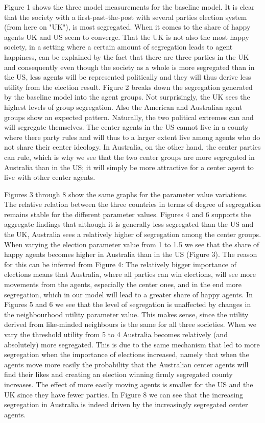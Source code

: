 \documentclass[12pt, a4paper]{article}
\begin{document}
	Figure 1 shows the three model measurements for the baseline model. It is clear that the society with a first-past-the-post with several parties election system (from here on "UK"), is most segregated. When it comes to the share of happy agents UK and US seem to converge. That the UK is not also the most happy society, in a setting where a certain amount of segregation leads to agent happiness, can be explained by the fact that there are three parties in the UK and consequently even though the society as a whole is more segregated than in the US, less agents will be represented politically and they will thus derive less utility from the election result. Figure 2 breaks down the segregation generated by the baseline model into the agent groups. Not surprisingly, the UK sees the highest levels of group segregation. Also the American and Australian agent groups show an expected pattern. Naturally, the two political extremes can and will segregate themselves. The center agents in the US cannot live in a county where there party rules and will thus to a larger extent live among agents who do not share their center ideology. In Australia, on the other hand, the center parties can rule, which is why we see that the two center groups are more segregated in Australia than in the US; it will simply be more attractive for a center agent to live with other center agents.
	
	Figures 3 through 8 show the same graphs for the parameter value variations. The relative relation between the three countries in terms of degree of segregation remains stable for the different parameter values. Figures 4 and 6 supports the aggregate findings that although it is generally less segregated than the US and the UK, Australia sees a relatively higher of segregation among the center groups. When varying the election parameter value from 1 to 1.5 we see that the share of happy agents becomes higher in Australia than in the US (Figure 3). The reason for this can be inferred from Figure 4: The relatively bigger importance of elections means that Australia, where all parties can win elections, will see more movements from the agents, especially the center ones, and in the end more segregation, which in our model will lead to a greater share of happy agents. In Figures 5 and 6 we see that the level of segregation is unaffected by changes in the neighbourhood utility parameter value. This makes sense, since the utility derived from like-minded neighbours is the same for all three societies. When we vary the threshold utility from 5 to 4 Australia becomes relatively (and absolutely) more segregated. This is due to the same mechanism that led to more segregation when the importance of elections increased, namely that when the agents move more easily the probability that the Australian center agents will find their likes and creating an election winning firmly segregated county increases. The effect of more easily moving agents is smaller for the US and the UK since they have fewer parties. In Figure 8 we can see that the increasing segregation in Australia is indeed driven by the increasingly segregated center agents.        
	
\end{document}
